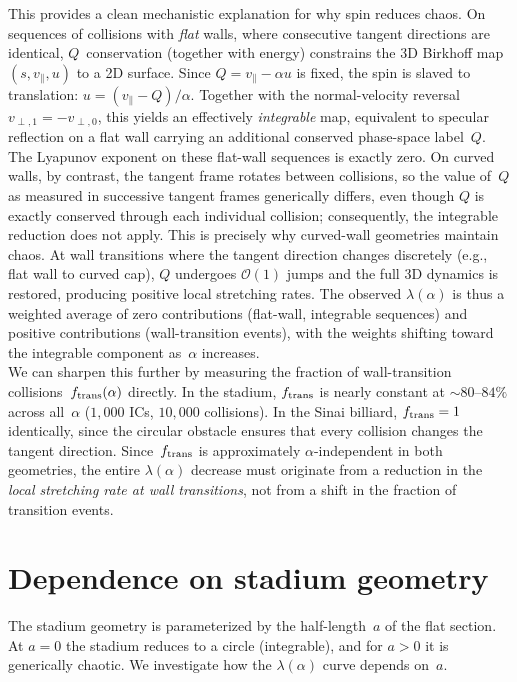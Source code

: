\documentclass[aps,prd,twocolumn,superscriptaddress,nofootinbib,floatfix]{revtex4-2}
\begin{document}
\noindent
This provides a clean mechanistic explanation for why spin reduces chaos. On sequences of collisions with \emph{flat} walls, where consecutive tangent directions are identical, $Q$~conservation (together with energy) constrains the 3D Birkhoff map $(s, v_\parallel, u)$ to a 2D surface. Since $Q = v_\parallel - \alpha u$ is fixed, the spin is slaved to translation: $u = (v_\parallel - Q)/\alpha$. Together with the normal-velocity reversal $v_{\perp,1} = -v_{\perp,0}$, this yields an effectively \emph{integrable} map, equivalent to specular reflection on a flat wall carrying an additional conserved phase-space label~$Q$. The Lyapunov exponent on these flat-wall sequences is exactly zero. On curved walls, by contrast, the tangent frame rotates between collisions, so the value of~$Q$ as measured in successive tangent frames generically differs, even though $Q$ is exactly conserved through each individual collision; consequently, the integrable reduction does not apply. This is precisely why curved-wall geometries maintain chaos. At wall transitions where the tangent direction changes discretely (e.g., flat wall to curved cap), $Q$ undergoes $\mathcal{O}(1)$ jumps and the full 3D dynamics is restored, producing positive local stretching rates. The observed $\lambda(\alpha)$ is thus a weighted average of zero contributions (flat-wall, integrable sequences) and positive contributions (wall-transition events), with the weights shifting toward the integrable component as~$\alpha$ increases.\\

\noindent
We can sharpen this further by measuring the fraction of wall-transition collisions~$f_{\rm trans}(\alpha)$ directly. In the stadium, $f_{\rm trans}$ is nearly constant at $\sim\!80\text{--}84\%$ across all~$\alpha$ ($1{,}000$ ICs, $10{,}000$ collisions). In the Sinai billiard, $f_{\rm trans} = 1$ identically, since the circular obstacle ensures that every collision changes the tangent direction. Since~$f_{\rm trans}$ is approximately $\alpha$-independent in both geometries, the entire $\lambda(\alpha)$ decrease must originate from a reduction in the \emph{local stretching rate at wall transitions}, not from a shift in the fraction of transition events.


\section{Dependence on stadium geometry}
\label{sec:geometry_scan}
\noindent
The stadium geometry is parameterized by the half-length~$a$ of the flat section. At $a=0$ the stadium reduces to a circle (integrable), and for $a>0$ it is generically chaotic. We investigate how the $\lambda(\alpha)$ curve depends on~$a$.\\
\end{document}
